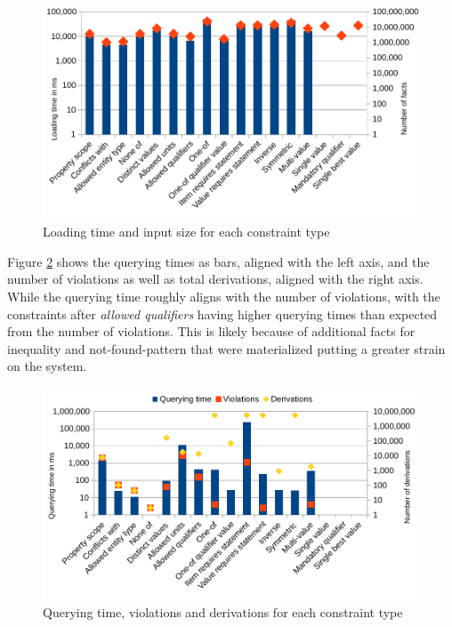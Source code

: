 \documentclass[hyperref,bachelorofscience,fleqn]{cgvpub}
\begin{document}
\begin{figure}
\includegraphics[width=\linewidth]{images/LoadingTime.pdf}
\caption{Loading time and input size for each constraint type}\label{fig_loading_time}
\end{figure}

Figure \ref{fig_querying_time} shows the querying times as bars, aligned with the left axis, and the number of violations as well as total derivations, aligned with the right axis. While the querying time roughly aligns with the number of violations, with the constraints after \emph{allowed qualifiers} having higher querying times than expected from the number of violations. This is likely because of additional facts for inequality and not-found-pattern that were materialized putting a greater strain on the system.

\begin{figure}
\includegraphics[width=\linewidth]{images/QueryingTime.pdf}
\caption{Querying time, violations and derivations for each constraint type}\label{fig_querying_time}
\end{figure}
\end{document}
